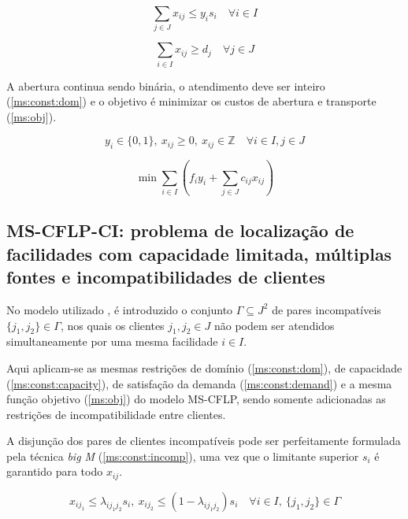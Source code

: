 \documentclass[]{article}
\begin{document}
	\begin{equation}
		\label{ms:const:capacity}		
		\sum_{j \in J} x_{ij} \le y_i s_i 
		\quad
		\forall i \in I
	\end{equation}	
	
	\begin{equation}
		\label{ms:const:demand}		
		\sum_{i \in I} x_{ij} \ge d_j 
		\quad
		\forall j \in J
	\end{equation}
	
	A abertura continua sendo binária, o atendimento deve ser inteiro (\ref{ms:const:dom}) 
	e o objetivo é minimizar os custos de abertura e transporte (\ref{ms:obj}).
	
	\begin{equation}
		\label{ms:const:dom}		
		y_i \in \{0, 1\}, 
		\ x_{ij} \ge 0, 
		\ x_{ij} \in \mathbb{Z}
		\quad
		\forall i \in I, j \in J
	\end{equation}	
	
	\begin{equation}
		\label{ms:obj}		
		\min \sum_{i \in I} 
		(
		f_i y_i + \sum_{j \in J} c_{ij} x_{ij}
		)
	\end{equation}

 \subsection{MS-CFLP-CI: problema de localização de facilidades com capacidade limitada, múltiplas fontes e incompatibilidades de clientes}
    
 
	No modelo utilizado \cite{mess}, é introduzido o conjunto $\Gamma \subseteq J^2$ de pares incompatíveis $\{ j_1, j_2 \} \in \Gamma$, 
	nos quais os clientes $j_1, j_2 \in J$ não podem ser atendidos simultaneamente por uma mesma facilidade $i \in I$.

    Aqui aplicam-se as mesmas restrições de domínio (\ref{ms:const:dom}), de capacidade (\ref{ms:const:capacity}), de satisfação da demanda (\ref{ms:const:demand}) e a mesma função objetivo (\ref{ms:obj}) do modelo MS-CFLP, sendo somente adicionadas as restrições de incompatibilidade entre clientes.
 
	A disjunção dos pares de clientes incompatíveis pode ser perfeitamente formulada pela técnica \textit{big M} (\ref{ms:const:incomp}), 
	uma vez que o limitante superior $s_i$ é garantido para todo $x_{ij}$.
	
	\begin{equation}
		\label{ms:const:incomp}		
		x_{ij_1} \le \lambda_{ij_1j_2} s_i, 
		\ x_{ij_2} \le (1 - \lambda_{ij_1j_2}) s_i 
		\quad
		\forall i \in I, 
		\ \{ j_1, j_2 \} \in \Gamma  
	\end{equation}
\end{document}
